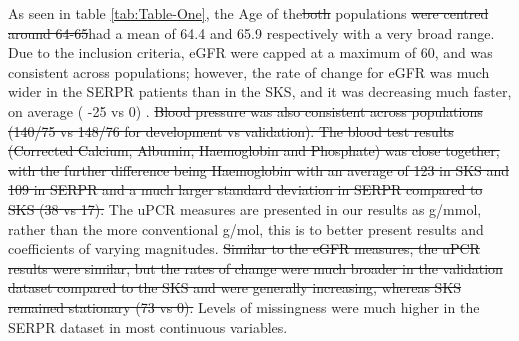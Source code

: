 \documentclass[
]{article}
\begin{document}
As seen in table \ref{tab:Table-One}, the Age of the\sout{both} populations \sout{were centred around 64-65}had a mean of 64.4 and 65.9 respectively with a very broad range. Due to the inclusion criteria, eGFR were capped at a maximum of 60, and was consistent across populations; however, the rate of change for eGFR was much wider in the SERPR patients than in the SKS, and it was decreasing much faster, on average ( -25 vs 0) . \sout{Blood pressure was also consistent across populations (140/75 vs 148/76 for development vs validation). The blood test results (Corrected Calcium, Albumin, Haemoglobin and Phosphate) was close together, with the further difference being Haemoglobin with an average of 123 in SKS and 109 in SERPR and a much larger standard deviation in SERPR compared to SKS (38 vs 17).} The uPCR measures are presented in our results as g/mmol, rather than the more conventional g/mol, this is to better present results and coefficients of varying magnitudes. \sout{Similar to the eGFR measures, the uPCR results were similar, but the rates of change were much broader in the validation dataset compared to the SKS and were generally increasing, whereas SKS remained stationary (73 vs 0).} Levels of missingness were much higher in the SERPR dataset in most continuous variables.
\end{document}
